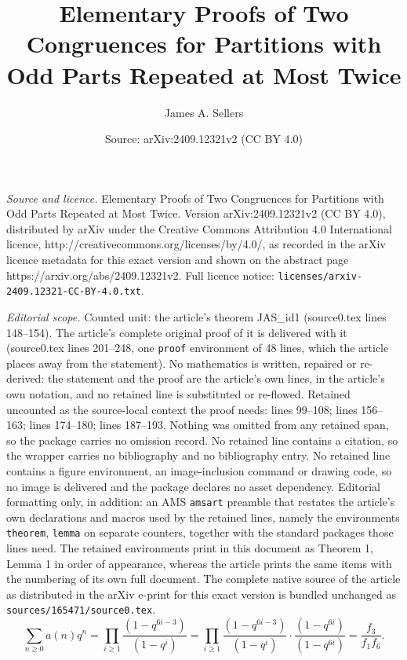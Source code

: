 \documentclass[10pt,a4paper]{amsart}
\title{Elementary Proofs of Two Congruences for Partitions with Odd Parts Repeated at Most Twice}
\author{James A. Sellers}
\date{Source: arXiv:2409.12321v2 (CC BY 4.0)}
\begin{document}
\maketitle

\noindent\emph{Source and licence.} Elementary Proofs of Two Congruences for Partitions with Odd Parts Repeated at Most Twice. Version arXiv:2409.12321v2 (CC BY 4.0), distributed by arXiv under the Creative Commons Attribution 4.0 International licence, http://creativecommons.org/licenses/by/4.0/, as recorded in the arXiv licence metadata for this exact version and shown on the abstract page https://arxiv.org/abs/2409.12321v2. Full licence notice: \texttt{licenses/arxiv-2409.12321-CC-BY-4.0.txt}.\par\smallskip

\noindent\textit{Editorial scope.} Counted unit: the article's theorem JAS\_id1 (source0.tex lines 148--154). The article's complete original proof of it is delivered with it (source0.tex lines 201--248, one \texttt{proof} environment of 48 lines, which the article places away from the statement). No mathematics is written, repaired or re-derived: the statement and the proof are the article's own lines, in the article's own notation, and no retained line is substituted or re-flowed.  Retained uncounted as the source-local context the proof needs: lines 99--108; lines 156--163; lines 174--180; lines 187--193.  Nothing was omitted from any retained span, so the package carries no omission record.  No retained line contains a citation, so the wrapper carries no bibliography and no bibliography entry.  No retained line contains a figure environment, an image-inclusion command or drawing code, so no image is delivered and the package declares no asset dependency.  Editorial formatting only, in addition: an AMS \texttt{amsart} preamble that restates the article's own declarations and macros used by the retained lines, namely the environments \texttt{theorem}, \texttt{lemma} on separate counters, together with the standard packages those lines need.  The retained environments print in this document as Theorem 1, Lemma 1 in order of appearance, whereas the article prints the same items with the numbering of its own full document.  The complete native source of the article as distributed in the arXiv e-print for this exact version is bundled unchanged as \texttt{sources/165471/source0.tex}.
\begin{equation}
\label{genfn_a}
\sum_{n\geq 0} a(n)q^n 
=
\prod_{i\geq 1} \frac{(1-q^{6i-3})}{(1-q^i)} 
= 
\prod_{i\geq 1} \frac{(1-q^{6i-3})}{(1-q^i)} \cdot \frac{(1-q^{6i})}{(1-q^{6i})} 
= 
\frac{f_3}{f_1f_6}.
\end{equation}
\end{document}
